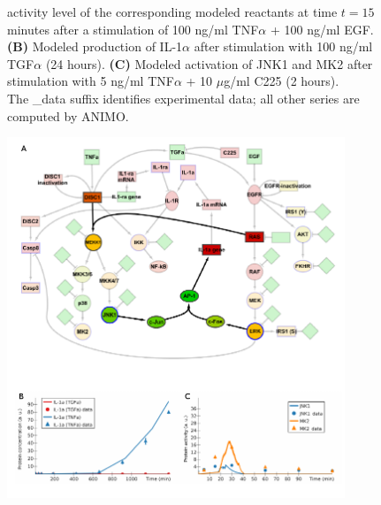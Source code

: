 \documentclass{bmcart}
\begin{document}
\begin{backmatter}
\begin{figure}[!htpb]
{activity level of the corresponding modeled reactants at time $t = 15$ minutes after
a stimulation of 100 ng/ml TNF$\alpha$ + 100 ng/ml EGF.
{\bf(B)} %
Modeled production of IL-1$\alpha$ after stimulation with 100 ng/ml TGF$\alpha$ (24 hours).
{\bf(C)} %
Modeled activation of JNK1 and MK2 after stimulation with 5 ng/ml TNF$\alpha$ + 10 $\mu$g/ml C225 (2 hours).
\\
The {\sf \_{}data} suffix identifies experimental data; all other series are computed by ANIMO.}\label{fig:large-model-all}
\end{figure}


\begin{figure}[!tpb]
\begin{center}
  \includegraphics[width=0.9\textwidth]{images/large_network_legendg_oneImage}
\end{center}
\caption{
}
\end{figure}
\end{backmatter}
\end{document}

